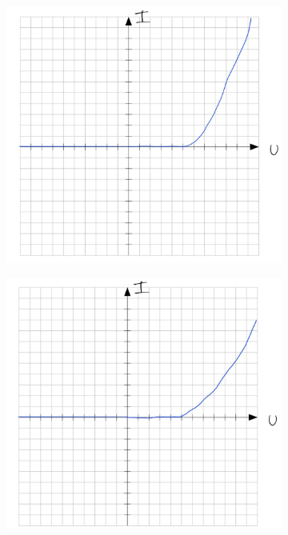 \begin{figure}[H]
\begin{subfigure}[b]{0.45\textwidth}
        \includegraphics[width=\textwidth]{Voraufgaben/Cb.jpg}
        \caption{}
        \label{fig:VA_C_b}
    \end{subfigure}
    \vspace{0.5em}
    \begin{subfigure}[b]{0.45\textwidth}
        \includegraphics[width=\textwidth]{Voraufgaben/Cc.jpg}

\end{subfigure}
\end{figure}
